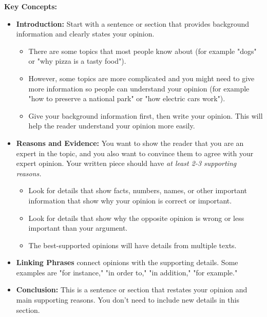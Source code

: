 \documentclass[12pt]{article}
\begin{document}
\begin{tcolorbox}[colframe=black!60, colback=white, 
coltitle=black, colbacktitle=black!15, fonttitle=\bfseries\Large, 
title=Key Concepts and Vocabulary, halign title=center, left=10pt, right=10pt, top=10pt, bottom=15pt]
\textbf{Key Concepts:}
\begin{itemize}
    \item \textbf{Introduction:} Start with a sentence or section that provides background information and clearly states your opinion.
    \begin{itemize}
        \item There are some topics that most people know about (for example "dogs" or "why pizza is a tasty food").   
        \item However, some topics are more complicated and you might need to give more information so people can understand your opinion (for example "how to preserve a national park" or "how electric cars work").
        \item Give your background information first, then write your opinion. This will help the reader understand your opinion more easily.
    \end{itemize}

    \item \textbf{Reasons and Evidence:} You want to show the reader that you are an expert in the topic, and you also want to convince them to agree with your expert opinion. Your written piece should have \textit{at least 2-3 supporting reasons.}
    \begin{itemize}
        \item Look for details that show facts, numbers, names, or other important information that show why your opinion is correct or important.
        \item Look for details that show why the opposite opinion is wrong or less important than your argument.
        \item The best-supported opinions will have details from multiple texts.
    \end{itemize}
    \item \textbf{Linking Phrases} connect opinions with the supporting details. Some examples are "for instance," "in order to," "in addition," "for example."
    \item \textbf{Conclusion:} This is a sentence or section that restates your opinion and main supporting reasons. You don't need to include new details in this section.
    \end{itemize}
\end{tcolorbox}
\end{document}
